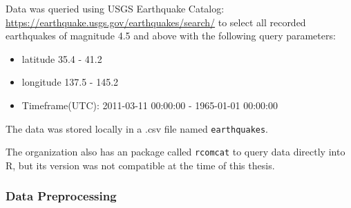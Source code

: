 

Data was queried using USGS Earthquake Catalog:
\url{https://earthquake.usgs.gov/earthquakes/search/} to select all
recorded earthquakes of magnitude 4.5 and above with the following query
parameters:

\begin{itemize}
\tightlist
\item
  latitude 35.4 - 41.2
\item
  longitude 137.5 - 145.2
\item
  Timeframe(UTC): 2011-03-11 00:00:00 - 1965-01-01 00:00:00
\end{itemize}

The data was stored locally in a .csv file named \texttt{earthquakes}.

The organization also has an package called \texttt{rcomcat} to query
data directly into R, but its version was not compatible at the
time of this thesis.

\hypertarget{data-preprocessing}{%
\subsubsection{Data Preprocessing}\label{data-preprocessing}}

